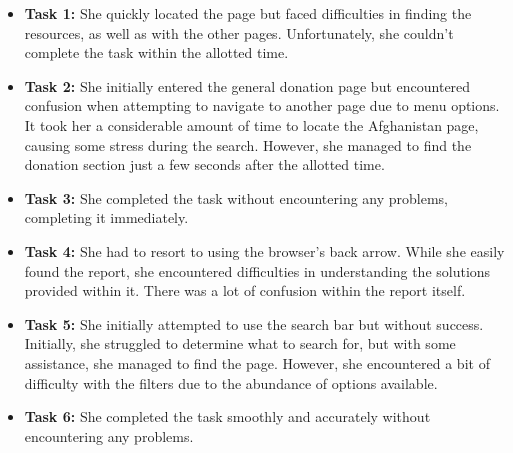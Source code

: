 \begin{itemize}
    \item \textbf{Task 1:} She quickly located the page but faced difficulties in finding the resources, as well as with the other pages. Unfortunately, she couldn't complete the task within the allotted time.
    \item \textbf{Task 2:} She initially entered the general donation page but encountered confusion when attempting to navigate to another page due to menu options. It took her a considerable amount of time to locate the Afghanistan page, causing some stress during the search. However, she managed to find the donation section just a few seconds after the allotted time.
    \item \textbf{Task 3:} She completed the task without encountering any problems, completing it immediately.
    \item \textbf{Task 4:} She had to resort to using the browser's back arrow. While she easily found the report, she encountered difficulties in understanding the solutions provided within it. There was a lot of confusion within the report itself.
    \item \textbf{Task 5:} She initially attempted to use the search bar but without success. Initially, she struggled to determine what to search for, but with some assistance, she managed to find the page. However, she encountered a bit of difficulty with the filters due to the abundance of options available.
    \item \textbf{Task 6:} She completed the task smoothly and accurately without encountering any problems.
\end{itemize}





\vspace{1cm}


